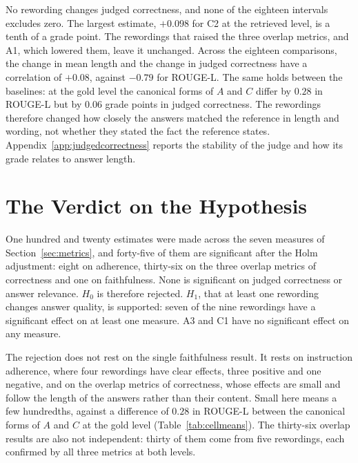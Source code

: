 \documentclass[12pt,a4paper,oneside]{scrreprt}
\begin{document}
No rewording changes judged correctness, and none of the eighteen intervals excludes zero. The largest estimate, $+0.098$ for C2 at the retrieved level, is a tenth of a grade point. The rewordings that raised the three overlap metrics, and A1, which lowered them, leave it unchanged. Across the eighteen comparisons, the change in mean length and the change in judged correctness have a correlation of $+0.08$, against $-0.79$ for ROUGE-L. The same holds between the baselines: at the gold level the canonical forms of $A$ and $C$ differ by $0.28$ in ROUGE-L but by $0.06$ grade points in judged correctness. The rewordings therefore changed how closely the answers matched the reference in length and wording, not whether they stated the fact the reference states. Appendix~\ref{app:judgedcorrectness} reports the stability of the judge and how its grade relates to answer length.

\section{The Verdict on the Hypothesis}
\label{sec:verdict}

One hundred and twenty estimates were made across the seven measures of Section~\ref{sec:metrics}, and forty-five of them are significant after the Holm adjustment: eight on adherence, thirty-six on the three overlap metrics of correctness and one on faithfulness. None is significant on judged correctness or answer relevance. $H_0$ is therefore rejected. $H_1$, that at least one rewording changes answer quality, is supported: seven of the nine rewordings have a significant effect on at least one measure. A3 and C1 have no significant effect on any measure.

The rejection does not rest on the single faithfulness result. It rests on instruction adherence, where four rewordings have clear effects, three positive and one negative, and on the overlap metrics of correctness, whose effects are small and follow the length of the answers rather than their content. Small here means a few hundredths, against a difference of $0.28$ in ROUGE-L between the canonical forms of $A$ and $C$ at the gold level (Table~\ref{tab:cellmeans}). The thirty-six overlap results are also not independent: thirty of them come from five rewordings, each confirmed by all three metrics at both levels.
\end{document}
